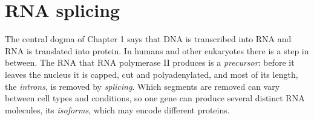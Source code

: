 
\providecommand{\R}{\mathbb{R}}
\providecommand{\E}{\mathbb{E}}
\providecommand{\Normal}{\mathcal{N}}
\providecommand{\argmax}{\operatorname*{arg\,max}}
\providecommand{\argmin}{\operatorname*{arg\,min}}
\providecommand{\vy}{\mathbf{y}}
\providecommand{\vx}{\mathbf{x}}
\providecommand{\mX}{\mathbf{X}}
\providecommand{\mI}{\mathbf{I}}
\providecommand{\vb}{\boldsymbol{\beta}}
\providecommand{\veps}{\boldsymbol{\epsilon}}
\providecommand{\vp}{\mathbf{p}}
\providecommand{\vg}{\mathbf{g}}
\providecommand{\ind}{\mathbf{1}}
\providecommand{\vpi}{\boldsymbol{\pi}}
\providecommand{\vu}{\mathbf{u}}
\providecommand{\mSigma}{\boldsymbol{\Sigma}}
\providecommand{\mLambda}{\boldsymbol{\Lambda}}
\providecommand{\KL}{\operatorname{KL}}
\providecommand{\vtheta}{\boldsymbol{\theta}}
\providecommand{\valpha}{\boldsymbol{\alpha}}
\providecommand{\vphi}{\boldsymbol{\phi}}
\providecommand{\veta}{\boldsymbol{\eta}}
\providecommand{\vz}{\mathbf{z}}
\providecommand{\mZ}{\mathbf{Z}}
\providecommand{\vr}{\mathbf{r}}
\providecommand{\va}{\mathbf{a}}
\providecommand{\vmu}{\boldsymbol{\mu}}
\providecommand{\Dir}{\operatorname{Dir}}
\providecommand{\Disc}{\operatorname{Discrete}}
\providecommand{\Bin}{\operatorname{Binomial}}
\providecommand{\BetaD}{\operatorname{Beta}}
\providecommand{\simplex}{\Delta}

\providecommand{\chaptertoc}{}
\chapter{RNA splicing}
\label{ch:splicing}
\chaptertoc

The central dogma of Chapter 1 says that DNA is transcribed into RNA and RNA is translated into protein. In humans and other eukaryotes there is a step in between. The RNA that RNA polymerase II produces is a \emph{precursor}: before it leaves the nucleus it is capped, cut and polyadenylated, and most of its length, the \emph{introns}, is removed by \emph{splicing}. Which segments are removed can vary between cell types and conditions, so one gene can produce several distinct RNA molecules, its \emph{isoforms}, which may encode different proteins.

